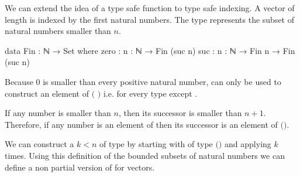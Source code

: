 We can extend the idea of a type safe  function to type safe
indexing.
A vector of length  is indexed by the first 
natural numbers.
The type \AgdaSpace{} represents the subset of
natural numbers smaller than $n$.

\begin{code}
data Fin : ℕ → Set where
  zero  : {n : ℕ} → Fin (suc n)
  suc   : {n : ℕ} → Fin n → Fin (suc n)
\end{code}
Because $0$ is smaller than every positive natural number,
 can only be used to construct an element of
\AgdaSpace{}$($
$)$ i.e. for every type except
\AgdaSpace{}.

If any number is smaller than $n$, then its successor is smaller than $n+1$.
Therefore, if any number is an element of
\AgdaSpace{}
then its successor is an element of
\AgdaSpace{}$($\AgdaSpace{}$)$.

We can construct a $k<n$ of type
\AgdaSpace{} by starting with
 of type
\AgdaSpace{}$($$)$ and applying
 $k$ times.
Using this definition of the bounded subsets of natural numbers we can define
a non partial version of \AgdaFunction{\_!\_} for vectors.

